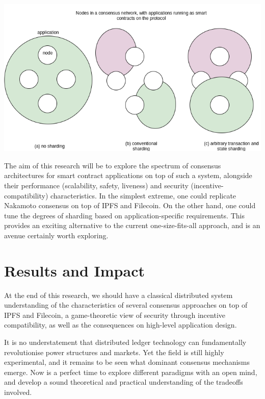 \documentclass[12pt]{article}
\begin{document}
\includegraphics[width=\textwidth]{sharding}

The aim of this research will be to explore the spectrum of consensus architectures for smart contract applications on top of such a system, alongside their performance (scalability, safety, liveness) and security (incentive-compatibility) characteristics. In the simplest extreme, one could replicate Nakamoto consensus on top of IPFS and Filecoin. On the other hand, one could tune the degrees of sharding based on application-specific requirements. This provides an exciting alternative to the current one-size-fits-all approach, and is an avenue certainly worth exploring.


\section*{Results and Impact}

At the end of this research, we should have a classical distributed system understanding of the characteristics of several consensus approaches on top of IPFS and Filecoin, a game-theoretic view of security through incentive compatibility, as well as the consequences on high-level application design.

It is no understatement that distributed ledger technology can fundamentally revolutionise power structures and markets. Yet the field is still highly experimental, and it remains to be seen what dominant consensus mechanisms emerge. Now is a perfect time to explore different paradigms with an open mind, and develop a sound theoretical and practical understanding of the tradeoffs involved.



\medskip
 
\end{document}
